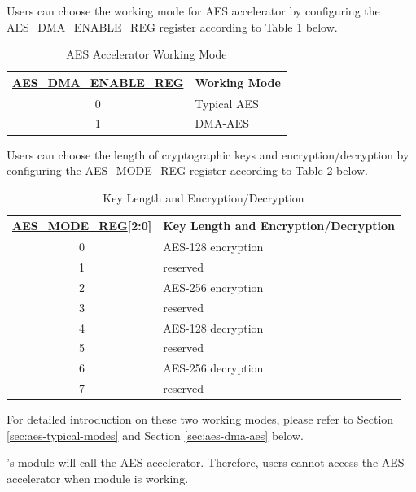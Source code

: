 \documentclass[main\_\_EN.tex]{subfiles}
\begin{document}
Users can choose the working mode for AES accelerator by configuring the \hyperref[regdesc:AESDMAENABLEREG]{AES\_DMA\_ENABLE\_REG} register according to Table \ref{tab:aes-dma-enable} below.

\begin{longtable}[c]{ | c | l | }
\caption{AES Accelerator Working Mode}
    \label{tab:aes-dma-enable}
    \\\hline
    \rowcolor{lightgray}
\hyperref[regdesc:AESDMAENABLEREG]{AES\_DMA\_ENABLE\_REG}       & Working Mode\\
        \hline
        0                       & Typical AES    \\
        \hline
        1                       & DMA-AES        \\
        \hline
\end{longtable}

Users can choose the length of cryptographic keys and encryption/decryption by configuring the \hyperref[regdesc:AESMODEREG]{AES\_MODE\_REG} register according to Table \ref{tab:aes-operation} below.

\begin{longtable}[c]{ | c | l | }
\caption{Key Length and Encryption/Decryption}
\label{tab:aes-operation}
\\\hline
\rowcolor{lightgray}
\hyperref[regdesc:AESMODEREG]{AES\_MODE\_REG}[2:0]     & Key Length and Encryption/Decryption\\
    \hline
    0                   & AES-128 encryption    \\
    \hline
    1                   & reserved    \\
    \hline
    2                   & AES-256 encryption    \\
    \hline
    3                   & reserved    \\
    \hline
    4                   & AES-128 decryption    \\
    \hline
    5                   & reserved    \\
    \hline
    6                   & AES-256 decryption    \\
    \hline
    7                   & reserved    \\
    \hline
\end{longtable}

For detailed introduction on these two working modes, please refer to Section \ref{sec:aes-typical-modes} and Section \ref{sec:aes-dma-aes} below.

\begin{importantlisting}
\vspace{-0.5em}
    \chipname{}'s  module will call the AES accelerator. Therefore, users cannot access the AES accelerator when  module is working.
\end{importantlisting}
\end{document}
